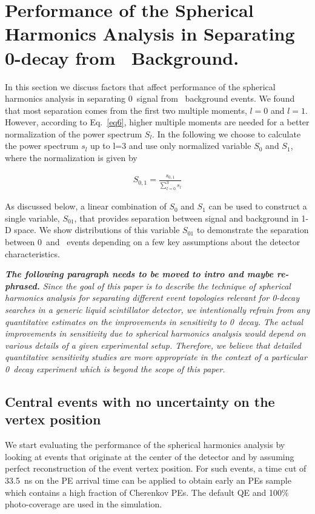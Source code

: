 \section{Performance of the Spherical Harmonics Analysis in Separating 0\nbb-decay from \B~Background.}
\label{sec:performance}

In this section we discuss factors that affect performance of the spherical harmonics analysis in separating
0\nbb~signal from \B~background events. We found that most separation comes from the first two multiple moments,
$l=0$ and $l=1$. However, according to Eq.~\ref{eq6}, higher multiple moments are needed for a better normalization of the 
power spectrum $S_l$. In the following we choose to calculate the power spectrum $s_l$ up to l=3 and
use only normalized variable $S_0$ and $S_1$, where the normalization is given by

\begin{eqnarray}
\label{eq7}
S_{0,1} = \frac{s_{0,1}}{\sum_{l=0}^{3} s_l}
\end{eqnarray}

As discussed below, a linear combination of $S_0$ and $S_1$ can be used to construct a single variable, $S_{01}$, that provides 
separation between signal and background in 1-D space. We show distributions of this variable $S_{01}$ to demonstrate
the separation between 0\nbb~and \B~events depending on a few key assumptions about the detector characteristics.


{\it {\bf The following paragraph needs to be moved to intro and maybe re-phrased. }
Since the goal of this paper is to describe the technique of spherical harmonics analysis for separating
different event topologies relevant for 0\nbb-decay searches in a generic liquid scintillator detector, we intentionally refrain from any 
quantitative estimates on the improvements in sensitivity to 0\nbb~decay. The actual improvements in sensitivity due to spherical 
harmonics analysis would depend on various details of a given experimental setup. Therefore, we believe that detailed quantitative 
sensitivity studies are more appropriate in the context of a particular 0\nbb~decay experiment which is beyond the scope of this paper.
}

\subsection{Central events with no uncertainty on the vertex position}

We start evaluating the performance of the spherical harmonics analysis by looking at events that originate at the center
of the detector and by assuming perfect reconstruction of the event vertex position. For such events, a time cut of 33.5~ns on 
the PE arrival time can be applied to obtain early an PEs sample which contains a high fraction of Cherenkov PEs. The default QE and 100\% 
photo-coverage are used in the simulation.

